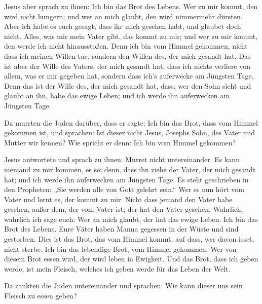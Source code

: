  Jesus aber sprach zu ihnen: Ich bin das Brot des Lebens.
Wer zu mir kommt, den wird nicht hungern; und wer an mich glaubt, den
wird nimmermehr dürsten.  Aber ich habe es euch gesagt,
dass ihr mich gesehen habt, und glaubet doch nicht. 
Alles, was mir mein Vater gibt, das kommt zu mir; und wer zu mir kommt,
den werde ich nicht hinausstoßen.  Denn ich bin vom
Himmel gekommen, nicht dass ich meinen Willen tue, sondern den Willen
des, der mich gesandt hat.  Das ist aber der Wille des
Vaters, der mich gesandt hat, dass ich nichts verliere von allem, was er
mir gegeben hat, sondern dass ich's auferwecke am Jüngsten Tage.
 Denn das ist der Wille des, der mich gesandt hat, dass,
wer den Sohn sieht und glaubt an ihn, habe das ewige Leben; und ich
werde ihn auferwecken am Jüngsten Tage.

 Da murrten die Juden darüber, dass er sagte: Ich bin das
Brot, dass vom Himmel gekommen ist,  und sprachen: Ist
dieser nicht Jesus, Josephs Sohn, des Vater und Mutter wir kennen? Wie
spricht er denn: Ich bin vom Himmel gekommen?

 Jesus antwortete und sprach zu ihnen: Murret nicht
untereinander.  Es kann niemand zu mir kommen, es sei
denn, dass ihn ziehe der Vater, der mich gesandt hat; und ich werde ihn
auferwecken am Jüngsten Tage.  Es steht geschrieben in
den Propheten: „Sie werden alle von Gott gelehrt sein.`` Wer es nun hört
vom Vater und lernt es, der kommt zu mir.  Nicht dass
jemand den Vater habe gesehen, außer dem, der vom Vater ist; der hat den
Vater gesehen.  Wahrlich, wahrlich ich sage euch: Wer an
mich glaubt, der hat das ewige Leben.  Ich bin das Brot
des Lebens.  Eure Väter haben Manna gegessen in der Wüste
und sind gestorben.  Dies ist das Brot, das vom Himmel
kommt, auf dass, wer davon isset, nicht sterbe.  Ich bin
das lebendige Brot, vom Himmel gekommen. Wer von diesem Brot essen wird,
der wird leben in Ewigkeit. Und das Brot, dass ich geben werde, ist mein
Fleisch, welches ich geben werde für das Leben der Welt.

 Da zankten die Juden untereinander und sprachen: Wie
kann dieser uns sein Fleisch zu essen geben?

